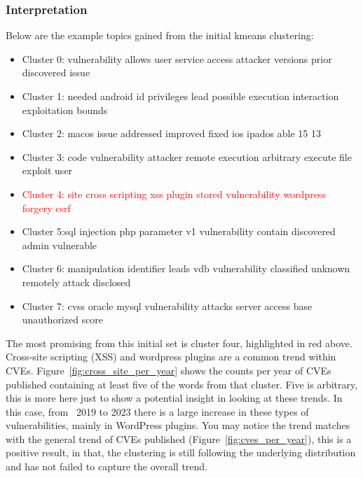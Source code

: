 \documentclass[12pt]{article}
\begin{document}
\subsubsection*{Interpretation}

Below are the example topics gained from the initial kmeans clustering:
\begin{itemize}

	\item Cluster 0: vulnerability allows user service access attacker versions prior discovered issue

	\item Cluster 1: needed android id privileges lead possible execution interaction exploitation bounds

	\item Cluster 2: macos issue addressed improved fixed ios ipados able 15 13

	\item Cluster 3: code vulnerability attacker remote execution arbitrary execute file exploit user

	\item \textcolor{red}{Cluster 4: site cross scripting xss plugin stored vulnerability wordpress
		      forgery csrf}

	\item Cluster 5:sql injection php parameter v1 vulnerability contain discovered
	      admin vulnerable

	\item Cluster 6: manipulation identifier leads vdb vulnerability classified unknown remotely attack disclosed

	\item Cluster 7: cvss oracle mysql vulnerability attacks server access base unauthorized score
\end{itemize}

The most promising from this initial set is cluster four, highlighted in red above. Cross-site
scripting (XSS) and wordpress plugins are a common trend within CVEs.
Figure~\ref{fig:cross_site_per_year} shows the counts per year of CVEs published containing at least five of the
words from that cluster. Five is arbitrary, this is more here just to show a potential insight in
looking at these trends. In this case, from ~2019 to 2023 there is a large increase in these types
of vulnerabilities, mainly in WordPress plugins. You may notice the trend matches with the general
trend of CVEs published (Figure~\ref{fig:cves_per_year}), this is a positive result, in that, the clustering
is still following the underlying distribution and has not failed to capture the overall trend.
\end{document}
